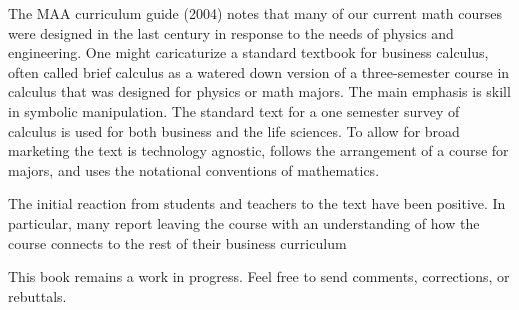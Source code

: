 \documentclass[10pt,]{book}
\theoremstyle{plain}
\theoremstyle{definition}
\theoremstyle{definition}
\begin{document}
The MAA curriculum guide (2004) notes that many of our current math courses were designed in the last century in response to the needs of physics and engineering. One might caricaturize a standard textbook for business calculus, often called brief calculus as a watered down version of a three-semester course in calculus that was designed for physics or math majors. The main emphasis is skill in symbolic manipulation. The standard text for a one semester survey of calculus is used for both business and the life sciences. To allow for broad marketing the text is technology agnostic, follows the arrangement of a course for majors, and uses the notational conventions of mathematics.%
\par
The initial reaction from students and teachers to the text have been positive.  In particular, many report leaving the course with an understanding of how the course connects to the rest of their business curriculum%
\par
 This book remains a work in progress.  Feel free to send comments, corrections, or rebuttals.%
\par
\end{document}
